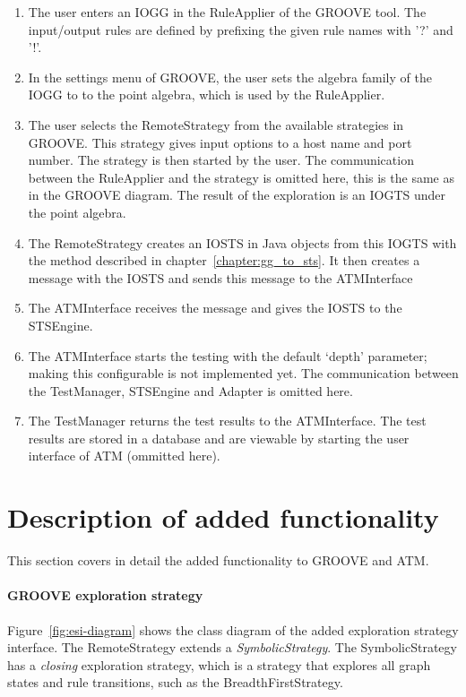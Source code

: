 \begin{enumerate}
\item The user enters an IOGG in the RuleApplier of the GROOVE tool. The input/output rules are defined by prefixing the given rule names with '?' and '!'. 
\item In the settings menu of GROOVE, the user sets the algebra family of the IOGG to to the point algebra, which is used by the RuleApplier.
\item The user selects the RemoteStrategy from the available strategies in GROOVE. This strategy gives input options to a host name and port number. The strategy is then started by the user. The communication between the RuleApplier and the strategy is omitted here, this is the same as in the GROOVE diagram. The result of the exploration is an IOGTS under the point algebra.
\item The RemoteStrategy creates an IOSTS in Java objects from this IOGTS with the method described in chapter~\ref{chapter:gg_to_sts}. It then creates a message with the IOSTS and sends this message to the ATMInterface
\item The ATMInterface receives the message and gives the IOSTS to the STSEngine.
\item The ATMInterface starts the testing with the default `depth' parameter; making this configurable is not implemented yet. The communication between the TestManager, STSEngine and Adapter is omitted here.
\item The TestManager returns the test results to the ATMInterface. The test results are stored in a database and are viewable by starting the user interface of ATM (ommitted here).
\end{enumerate}

\section{Description of added functionality}\label{sec:added_func}
This section covers in detail the added functionality to GROOVE and ATM. 

\paragraph*{GROOVE exploration strategy}
Figure~\ref{fig:esi-diagram} shows the class diagram of the added exploration strategy interface. The RemoteStrategy extends a \textit{SymbolicStrategy}. The SymbolicStrategy has a \textit{closing} exploration strategy, which is a strategy that explores all graph states and rule transitions, such as the BreadthFirstStrategy.

